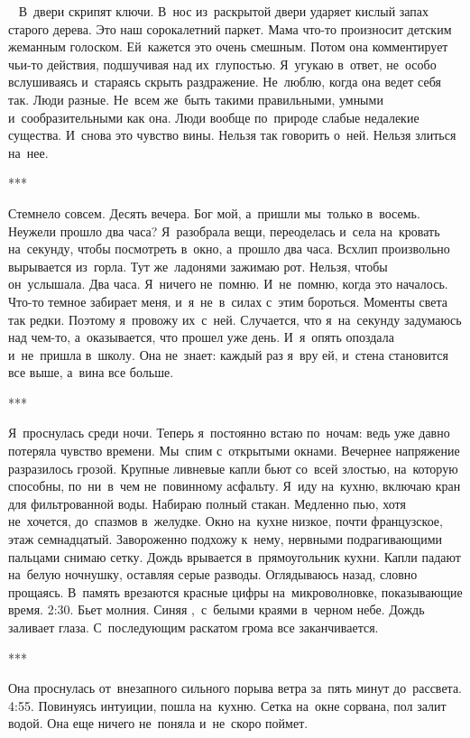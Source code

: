~
В~двери скрипят ключи.
В~нос из~раскрытой двери ударяет кислый запах старого дерева.
Это наш сорокалетний паркет.
Мама что-то произносит детским жеманным голоском.
Ей~кажется это очень смешным.
Потом она комментирует чьи-то действия, подшучивая над их~глупостью.
Я~угукаю в~ответ, не~особо вслушиваясь и~стараясь скрыть раздражение.
Не~люблю, когда она ведет себя так.
Люди разные.
Не~всем же~быть такими правильными, умными и~сообразительными как она.
Люди вообще по~природе слабые недалекие существа.
И~снова это чувство вины.
Нельзя так говорить о~ней.
Нельзя злиться на~нее.

\begin{center}
	***
\end{center}

Стемнело совсем.
Десять вечера.
Бог мой, а~пришли мы~только в~восемь.
Неужели прошло два часа? Я~разобрала вещи, переоделась и~села на~кровать на~секунду, чтобы посмотреть в~окно, а~прошло два часа.
Всхлип произвольно вырывается из~горла.
Тут же~ладонями зажимаю рот.
Нельзя, чтобы он~услышала.
Два часа.
Я~ничего не~помню.
И~не~помню, когда это началось.
Что-то темное забирает меня, и~я~не~в~силах с~этим бороться.
Моменты света так редки.
Поэтому я~провожу их~с~ней.
Случается, что я~на~секунду задумаюсь над чем-то, а~оказывается, что прошел уже день.
И~я~опять опоздала и~не~пришла в~школу.
Она не~знает: каждый раз я~вру ей, и~стена становится все выше, а~вина все больше.

\begin{center}
	***
\end{center}
 
Я~проснулась среди ночи.
Теперь я~постоянно встаю по~ночам: ведь уже давно потеряла чувство времени.
Мы~спим с~открытыми окнами.
Вечернее напряжение разразилось грозой.
Крупные ливневые капли бьют со~всей злостью, на~которую способны, по~ни~в~чем не~повинному асфальту.
Я~иду на~кухню, включаю кран для фильтрованной воды.
Набираю полный стакан.
Медленно пью, хотя не~хочется, до~спазмов в~желудке.
Окно на~кухне низкое, почти французское, этаж семнадцатый.
Завороженно подхожу к~нему, нервными подрагивающими пальцами снимаю сетку.
Дождь врывается в~прямоугольник кухни.
Капли падают на~белую ночнушку, оставляя серые разводы.
Оглядываюсь назад, словно прощаясь.
В~память врезаются красные цифры на~микроволновке, показывающие время.
2:30.
Бьет молния.
Синяя ,~с~белыми краями в~черном небе.
Дождь заливает глаза.
С~последующим раскатом грома все заканчивается.

\begin{center}
	***
\end{center}

Она проснулась от~внезапного сильного порыва ветра за~пять минут до~рассвета.
4:55.
Повинуясь интуиции, пошла на~кухню.
Сетка на~окне сорвана, пол залит водой.
Она еще ничего не~поняла и~не~скоро поймет.


